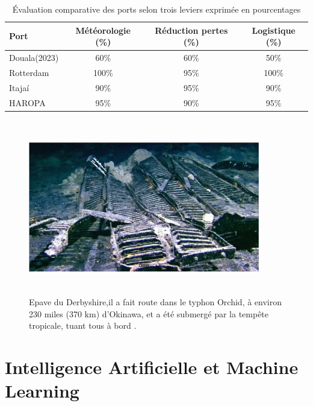\documentclass[a4paper,12pt,openany]{report}
\begin{document}
\begin{table}[h!]
\caption{Évaluation comparative des ports selon trois leviers exprimée en pourcentages}
	\centering
	\begin{tabular}{|l|c|c|c|}
		\hline
		\textbf{Port} & \textbf{Météorologie (\%)} & \textbf{Réduction pertes (\%)} & \textbf{Logistique (\%)} \\
		\hline
		Douala(2023)    & 60\%  & 60\%  & 50\%  \\
		\hline
		Rotterdam & 100\% & 95\%  & 100\% \\
		\hline
		Itajaí    & 90\%  & 95\%  & 90\%  \\
		\hline
		HAROPA    & 95\%  & 90\%  & 95\%  \\
		\hline
	\end{tabular}
\label{tab:levers-perf-percent}
\end{table}
\begin{figure}[H]
	\begin{center}
		\begin{minipage}{\textwidth}
			\begin{center}
				\includegraphics[width=0.9\textwidth,height=3in]{images/Epave_derbyshire.png}
			\end{center}
		\end{minipage}
		\caption{Epave du  Derbyshire,il a fait route dans le typhon Orchid, à environ 230 miles (370 km) d'Okinawa, et a été submergé par la tempête tropicale, tuant tous à bord \cite{Gaillarde2001}. \label{fig1.4}} 
	\end{center}
\end{figure}


	
	\section{Intelligence Artificielle et Machine Learning}
\end{document}
